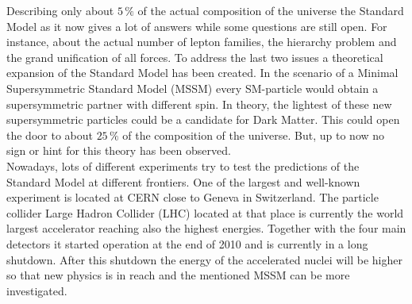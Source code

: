 Describing only about $5\,\%$ of the actual composition of the universe the Standard Model as it now gives a lot of answers while some questions are still open. For instance, about the actual number of lepton families, the hierarchy problem and the grand unification of all forces. To address the last two issues a theoretical expansion of the Standard Model has been created. In the scenario of a Minimal Supersymmetric Standard Model (MSSM) every SM-particle would obtain a supersymmetric partner with different spin. In theory, the lightest of these new supersymmetric particles could be a candidate for Dark Matter. This could open the door to about $25\,\%$ of the composition of the universe. But, up to now no sign or hint for this theory has been observed. \\

Nowadays, lots of different experiments try to test the predictions of the Standard Model at different frontiers. One of the largest and well-known experiment is located at CERN  close to Geneva in Switzerland. The particle collider Large Hadron Collider (LHC) located at that place is currently the world largest accelerator reaching also the highest energies. Together with the four main detectors it started operation at the end of 2010 and is currently in a long shutdown. After this shutdown the energy of the accelerated nuclei will be higher so that new physics is in reach and the mentioned MSSM can be more investigated. \\

